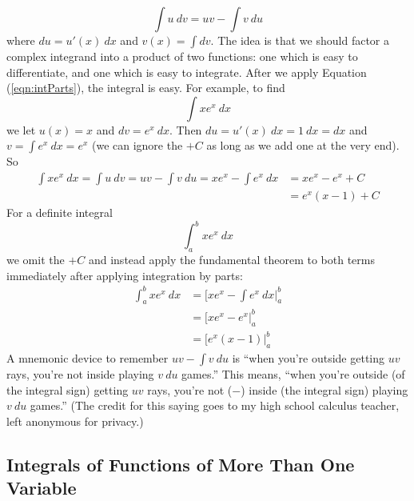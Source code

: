 \begin{equation} \label{eqn:intParts}
    \int u\ dv = u v - \int v\ du
\end{equation}
where $du = u'(x)\ dx$ and $v(x) = \int dv$. The idea is that we should factor a complex integrand into 
a product of two functions: one which is easy to differentiate, and one which is easy to 
integrate. After we apply Equation (\ref{eqn:intParts}), the integral is easy. For example, to find
\begin{equation*}
    \int x e^x\ dx
\end{equation*}
we let $u(x) = x$ and $dv = e^x\ dx$. Then $du = u'(x)\ dx = 1\ dx = dx$ and $
v = \int e^x\ dx = e^x$ (we can ignore the $+C$ as long as we add one at the very end). So 
\begin{equation*}
    \begin{aligned}
        \int x e^x\ dx = \int u\ dv = u v - \int v\ du = x e^x - \int e^x\ dx & = xe^x - e^x + C  \\ 
        & = \boxed{e^x (x - 1) + C}
    \end{aligned}
\end{equation*}
For a definite integral
\begin{equation*}
        \int_a^b x e^x\ dx 
\end{equation*}
we omit the $+C$ and instead apply the fundamental theorem to both terms immediately after applying integration by parts:
\begin{equation*}
    \begin{aligned}
        \int_a^b x e^x\ dx & = \Big[x e^x - \int e^x\ dx \Big|_a^b \\ 
        & = \Big[x e^x - e^x\Big|_a^b \\ 
        & = \Big[e^x(x-1)\Big|_a^b
    \end{aligned}
\end{equation*}
A mnemonic device to remember $u v - \int v\ du$ is ``when you're outside getting $uv$ rays, 
you're not inside playing $v\ du$ games.'' This means, ``when you're outside (of the integral sign) 
getting $uv$ rays, you're not ($-$) inside (the integral sign) playing $v\ du$ games.'' 
(The credit for this saying goes to my high school calculus teacher, left anonymous for privacy.)

\subsection{Integrals of Functions of More Than One Variable}

